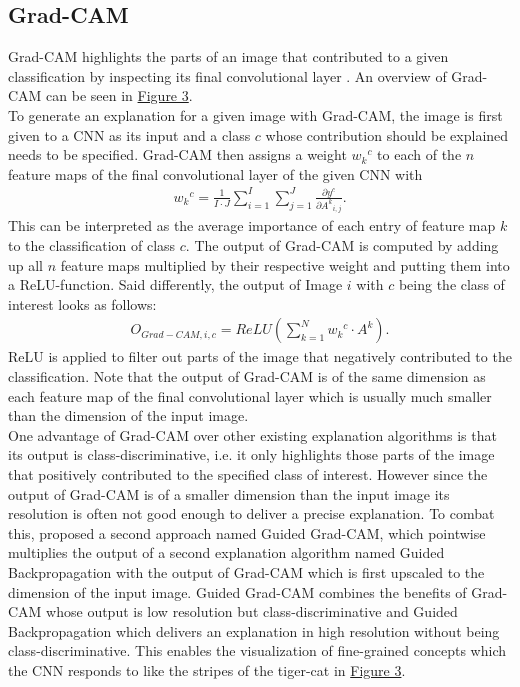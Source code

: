 \documentclass{article}
\begin{document}
\subsection{Grad-CAM}
Grad-CAM highlights the parts of an image that contributed to a given classification by inspecting its
final convolutional layer \cite{Selvaraju_2017_ICCV}. An overview of Grad-CAM can be seen in \hyperref[fig:gradcam]{Figure 3}. \\
To generate an explanation for a given image with Grad-CAM, the image is first given to a CNN as its input
and a class $c$ whose contribution should be explained needs to be specified. Grad-CAM then assigns a weight
${w_k}^c$ to each of the $n$ feature maps of the final convolutional layer of the given CNN with
\begin{align*}
    {w_k}^c = \frac{1}{I \cdot J} \sum\limits_{i=1}^{I} \sum\limits_{j=1}^J \frac{\partial y^c}{\partial {A^k}_{i,j}}.
\end{align*}
This can be interpreted as the average importance of each entry of feature map $k$ to the classification of class $c$.
The output of Grad-CAM is computed by adding up all $n$ feature maps multiplied by their respective weight and putting
them into a ReLU-function. Said differently, the output of Image $i$ with $c$ being the class of interest looks as follows:
\begin{align*}
    O_{Grad-CAM, i, c} = ReLU(\sum\limits_{k=1}^N {w_k}^c \cdot A^k).
\end{align*}
ReLU is applied to filter out parts of the image that
negatively contributed to the classification. Note that the output of Grad-CAM is of the same dimension as each
feature map of the final convolutional layer which is usually much smaller than the dimension of the input image. \\
One advantage of Grad-CAM over other existing explanation algorithms is that its output is class-discriminative,
i.e. it only highlights those parts of the image that positively contributed to the specified class of interest.
However since the output of Grad-CAM is of a smaller dimension than the input image its resolution is often not good enough
to deliver a precise explanation. To combat this, \cite{Selvaraju_2017_ICCV} proposed a second approach named Guided Grad-CAM,
which pointwise multiplies the output of a second explanation algorithm named Guided Backpropagation \cite{springenberg2015striving}
with the output of Grad-CAM which is first upscaled to the dimension of the input image. 
Guided Grad-CAM combines the benefits of Grad-CAM whose output is low resolution but class-discriminative and
Guided Backpropagation which delivers an explanation in high resolution without being class-discriminative.
This enables the visualization of fine-grained concepts which the CNN responds to like
the stripes of the tiger-cat in \hyperref[fig:gradcam]{Figure 3}. \\
\end{document}
